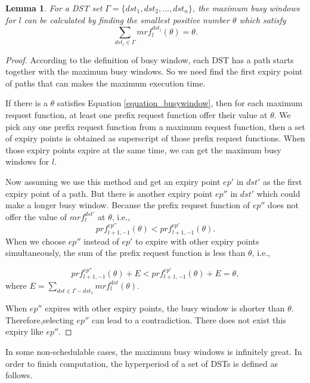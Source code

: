 \documentclass[10pt,conference]{IEEEtran}
\newtheorem{lemma}{Lemma}
\begin{document}
\begin{lemma}\label{lemma_busywindow}
For a DST set $\Gamma=\{dst_1,dst_2,\dots,dst_n\}$, the maximum busy windows for $l$ can be calculated by finding the smallest positive number $\theta$ which satisfy
\begin{equation}
\sum\limits_{dst_i\in \Gamma}mrf^{dst_i}_l(\theta)=\theta.\label{equation_busywindow}
\end{equation}
\end{lemma}

\begin{proof}
According to the definition of busy window, each DST has a path starts together with the maximum busy windows. So we need find the first expiry point of paths that can makes the maximum execution time.

If there is a $\theta$ satisfies Equation \ref{equation_busywindow}, then for each maximum request function, at least one prefix request function offer their value at $\theta$. We pick any one prefix request function from a maximum request function, then a set of expiry points is obtained as superscript of those prefix request functions. When those expiry points expire at the same time, we can get the maximum busy windows for $l$.

Now assuming we use this method and get an expiry point $ep'$ in $dst'$ as the first expiry point of a path. But there is another expiry point $ep''$ in $dst'$ which could make a longer busy window. Because the prefix request function of $ep''$ does not offer the value of $mrf^{dst'}_l$ at $\theta$, i.e.,
\[prf^{ep''}_{l+1,-1}(\theta)<prf^{ep'}_{l+1,-1}(\theta).\]
When we choose $ep''$ instead of $ep'$ to expire with other expiry points simultaneously, the sum of the prefix request function is less than $\theta$, i.e., 

\begin{equation}
prf^{ep''}_{l+1,-1}(\theta)+E<prf^{ep'}_{l+1,-1}(\theta)+E=\theta, 
\end{equation}
where $E=\sum\limits_{dst\in \Gamma-dst_1}mrf^{dst}_l(\theta)$.

When $ep''$ expires with other expiry points, the busy window is shorter than $\theta$. Therefore,selecting $ep''$ can lead to a contradiction. There does not exist this expiry like $ep''$.
\end{proof}

In some non-schedulable cases, the maximum busy windows is infinitely great. In order to finish computation, the hyperperiod of a set of DSTs is defined as follows.
\end{document}
